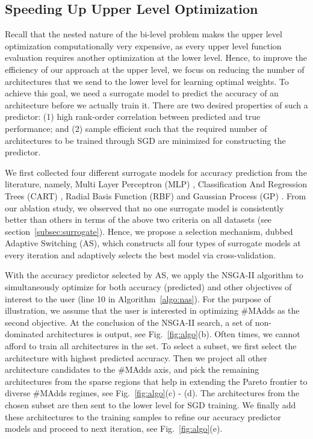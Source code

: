 \documentclass[runningheads]{llncs}
\begin{document}
\subsection{Speeding Up Upper Level Optimization}
Recall that the nested nature of the bi-level problem makes the upper level optimization computationally very expensive, as every upper level function evaluation requires another optimization at the lower level. Hence, to improve the efficiency of our approach at the upper level, we focus on reducing the number of architectures that we send to the lower level for learning optimal weights. To achieve this goal, we need a surrogate model to predict the accuracy of an architecture before we actually train it. There are two desired properties of such a predictor: (1) high rank-order correlation between predicted and true performance; and (2) sample efficient such that the required number of architectures to be trained through SGD are minimized for constructing the predictor.

We first collected four different surrogate models for accuracy prediction from the literature, namely, Multi Layer Perceptron (MLP) \cite{PNAS}, Classification And Regression Trees (CART) \cite{ae-cnn+e2epp}, Radial Basis Function (RBF) \cite{baker2017accelerating} and Gaussian Process (GP) \cite{chamnet}. From our ablation study, we observed that no one surrogate model is consistently better than others in terms of the above two criteria on all datasets (see section~\ref{subsec:surrogate}). Hence, we propose a selection mechanism, dubbed Adaptive Switching (AS), which constructs all four types of surrogate models at every iteration and adaptively selects the best model via cross-validation.

With the accuracy predictor selected by AS, we apply the NSGA-II algorithm to simultaneously optimize for both accuracy (predicted) and other objectives of interest to the user (line 10 in Algorithm~\ref{algo:nas}). For the purpose of illustration, we assume that the user is interested in optimizing \#MAdds as the second objective. At the conclusion of the NSGA-II search, a set of non-dominated architectures is output, see Fig.~\ref{fig:algo}(b). Often times, we cannot afford to train all architectures in the set. To select a subset, we first select the architecture with highest predicted accuracy. Then we project all other architecture candidates to the \#MAdds axis, and pick the remaining architectures from the sparse regions that help in extending the Pareto frontier to diverse \#MAdds regimes, see Fig.~\ref{fig:algo}(c) - (d). The architectures from the chosen subset are then sent to the lower level for SGD training. We finally add these architectures to the training samples to refine our accuracy predictor models and proceed to next iteration, see Fig.~\ref{fig:algo}(e).
\end{document}
